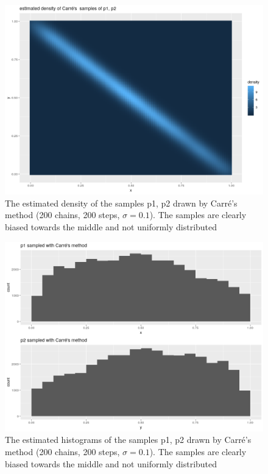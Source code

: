 	 \begin{minipage}{\linewidth}
	 	\centering
	 	\begin{minipage}{0.45\linewidth}
	 		\begin{figure}[H]
	 				\includegraphics[width=0.9\linewidth]{img/carre_estimated_density_p1_p2.png}
	 			\caption{The estimated density of the samples p1, p2 drawn by Carré's method (200 chains, 200 steps, $\sigma = 0.1$). The samples are clearly biased towards the middle and not uniformly distributed}
	 			\label{fig:carre_p1p2_estimated_dens}
	 		\end{figure}
	 	\end{minipage}
	 	\hspace{0.05\linewidth}
	 	\begin{minipage}{0.45\linewidth}
	 		\begin{figure}[H]
	 				\includegraphics[width=0.9\linewidth]{img/carre_p1_p2_hists.png}
	 			\caption{The estimated histograms of the samples p1, p2 drawn by Carré's method (200 chains, 200 steps, $\sigma = 0.1$). The samples are clearly biased towards the middle and not uniformly distributed}
	 			\label{fig:carre_p1_p2_hist}
	 		\end{figure}
	 	\end{minipage}
	 \end{minipage}




